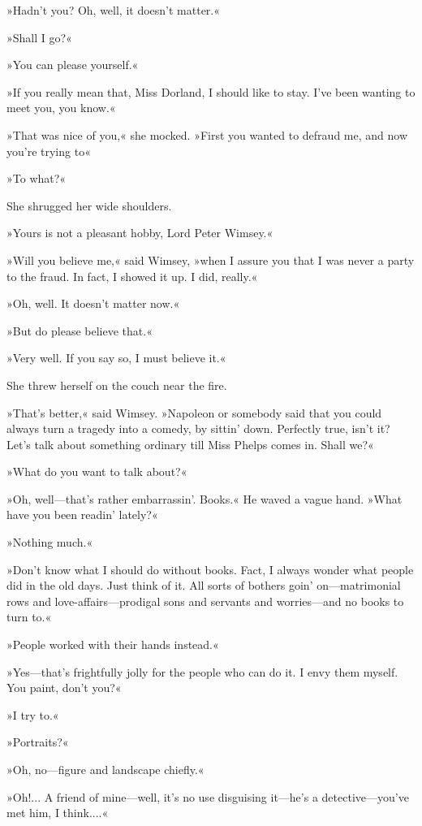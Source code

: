 »Hadn't you? Oh, well, it doesn't matter.«

»Shall I go?«

»You can please yourself.«

»If you really mean that, Miss Dorland, I should like to stay. I've been wanting to meet you, you know.«

»That was nice of you,« she mocked. »First you wanted to defraud me, and now you're trying to\longdash«

»To what?«

She shrugged her wide shoulders.

»Yours is not a pleasant hobby, Lord Peter Wimsey.«

»Will you believe me,« said Wimsey, »when I assure you that I was never a party to the fraud. In fact, I showed it up. I did, really.«

»Oh, well. It doesn't matter now.«

»But do please believe that.«

»Very well. If you say so, I must believe it.«

She threw herself on the couch near the fire.

»That's better,« said Wimsey. »Napoleon or somebody said that you could always turn a tragedy into a comedy, by sittin' down. Perfectly true, isn't it? Let's talk about something ordinary till Miss Phelps comes in. Shall we?«

»What do you want to talk about?«

»Oh, well—that's rather embarrassin'. Books.« He waved a vague hand. »What have you been readin' lately?«

»Nothing much.«

»Don't know what I should do without books. Fact, I always wonder what people did in the old days. Just think of it. All sorts of bothers goin' on—matrimonial rows and love-affairs—prodigal sons and servants and worries—and no books to turn to.«

»People worked with their hands instead.«

»Yes—that's frightfully jolly for the people who can do it. I envy them myself. You paint, don't you?«

»I try to.«

»Portraits?«

»Oh, no—figure and landscape chiefly.«

»Oh!... A friend of mine—well, it's no use disguising it—he's a detective—you've met him, I think....«

